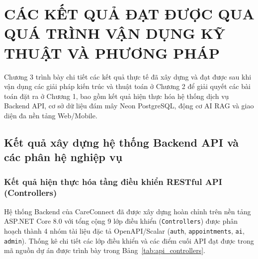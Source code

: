 \chapter{CÁC KẾT QUẢ ĐẠT ĐƯỢC QUA QUÁ TRÌNH VẬN DỤNG KỸ THUẬT VÀ PHƯƠNG PHÁP}

Chương 3 trình bày chi tiết các kết quả thực tế đã xây dựng và đạt được sau khi vận dụng các giải pháp kiến trúc và thuật toán ở Chương 2 để giải quyết các bài toán đặt ra ở Chương 1, bao gồm kết quả hiện thực hóa hệ thống dịch vụ Backend API, cơ sở dữ liệu đám mây Neon PostgreSQL, động cơ AI RAG và giao diện đa nền tảng Web/Mobile.

\section{Kết quả xây dựng hệ thống Backend API và các phân hệ nghiệp vụ}

\subsection{Kết quả hiện thực hóa tầng điều khiển RESTful API (Controllers)}

Hệ thống Backend của CareConnect đã được xây dựng hoàn chỉnh trên nền tảng ASP.NET Core 8.0 với tổng cộng 9 lớp điều khiển (\texttt{Controllers}) được phân hoạch thành 4 nhóm tài liệu đặc tả OpenAPI/Scalar (\texttt{auth}, \texttt{appointments}, \texttt{ai}, \texttt{admin}). Thống kê chi tiết các lớp điều khiển và các điểm cuối API đạt được trong mã nguồn dự án được trình bày trong Bảng~\ref{tab:api_controllers}.

